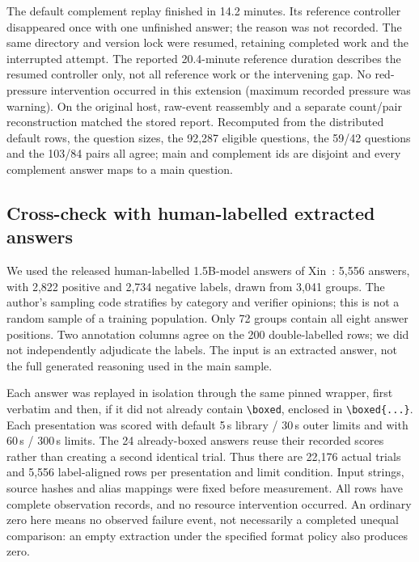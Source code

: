\documentclass[10pt,a4paper]{article}
\let\cite\citep
\begin{document}
The default complement replay finished in 14.2 minutes. Its reference
controller disappeared once with one unfinished answer; the reason was
not recorded. The same directory and version lock were resumed, retaining
completed work and the interrupted attempt. The reported 20.4-minute
reference duration describes the resumed controller only, not all reference
work or the intervening gap. No red-pressure intervention occurred in this
extension (maximum recorded pressure was warning). On the original host,
raw-event reassembly and a separate count/pair reconstruction matched the
stored report.
Recomputed from the distributed default rows, the question sizes, the
92,287 eligible questions, the 59/42 questions and the 103/84 pairs all agree;
main and complement ids are disjoint and every complement answer maps to a
main question.

\subsection{Cross-check with human-labelled extracted answers}
\label{sec:labels}

We used the released human-labelled 1.5B-model answers of
Xin~\cite{xin2026groupcorr,humanlabels}: 5,556 answers, with 2,822 positive
and 2,734 negative labels, drawn from 3,041 groups. The author's sampling
code stratifies by category and verifier opinions; this is not a random
sample of a training population. Only 72 groups contain all eight answer
positions. Two annotation columns agree on the 200 double-labelled rows;
we did not independently adjudicate the labels. The input is an extracted
answer, not the full generated reasoning used in the main sample.

Each answer was replayed in isolation through the same pinned wrapper,
first verbatim and then, if it did not already contain \verb|\boxed|,
enclosed in \verb|\boxed{...}|. Each presentation was scored with default
5\,s library / 30\,s outer limits and with 60\,s / 300\,s limits. The 24
already-boxed answers reuse their recorded scores rather than creating a
second identical trial. Thus there are 22,176 actual trials and 5,556
label-aligned rows per presentation and limit condition. Input strings,
source hashes and alias mappings were fixed before measurement. All rows
have complete observation records, and no resource intervention occurred.
An ordinary zero here means no observed failure event, not necessarily a
completed unequal comparison: an empty extraction under the specified
format policy also produces zero.
\end{document}
